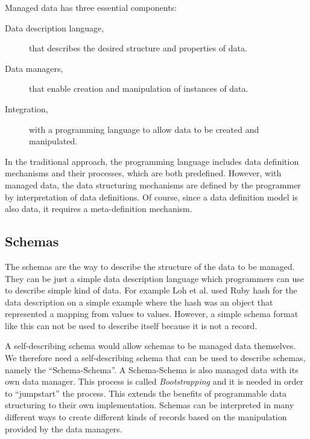 Managed data has three essential components:

\begin{description}
	\item [Data description language,] that describes the desired structure and properties of data.

	\item [Data managers,] that enable creation and manipulation of instances of data.

	\item [Integration,] with a programming language to allow data to be created and manipulated.
\end{description}

In the traditional approach, the programming language includes data definition mechanisms and their processes, which are both predefined. 
However, with managed data, the data structuring mechanisms are defined by the programmer by interpretation of data definitions.
Of course, since a data definition model is also data, it requires a meta-definition mechanism.

\subsection{Schemas}\label{Schemas}
The schemas are the way to describe the structure of the data to be managed. 
They can be just a simple data description language which programmers can use to describe simple kind of data. 
For example Loh et al. \cite{loh2012managed} used Ruby hash for the data description on a simple example where the hash was an object that represented a mapping from values to values. 
However, a simple schema format like this can not be used to describe itself because it is not a record. 

A self-describing schema would allow schemas to be managed data themselves. 
We therefore need a self-describing schema that can be used to describe schemas, namely the ``Schema-Schema''. 
A Schema-Schema is also managed data with its own data manager.
This process is called \textit{Bootstrapping} and it is needed in order to ``jumpstart'' the process. 
This extends the benefits of programmable data structuring to their own implementation.
Schemas can be interpreted in many different ways to create different kinds of records based on the manipulation provided by the data managers.

